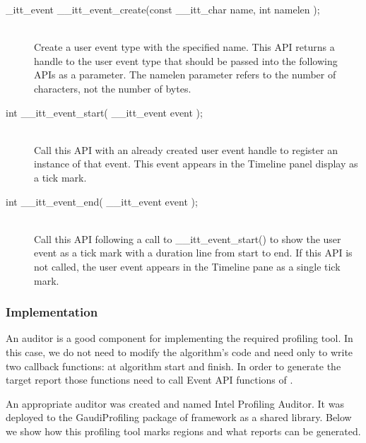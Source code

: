 \begin{description}
\item[\_itt\_event \_\_itt\_event\_create(const \_\_itt\_char \*name, int namelen );] \hfill \\
Create a user event type with the specified name. This API returns a handle to the user event type that should be 
passed into the following APIs as a parameter. The namelen parameter refers to the number of characters, 
not the number of bytes.

\item[int \_\_itt\_event\_start( \_\_itt\_event event );] \hfill \\
Call this API with an already created user event handle to register an instance of that event. This event appears 
in the Timeline panel display as a tick mark.

\item[int \_\_itt\_event\_end( \_\_itt\_event event );] \hfill \\
Call this API following a call to \_\_itt\_event\_start() to show the user event as a tick mark with a duration line 
from start to end. If this API is not called, the user event appears in the Timeline pane as a single tick mark.
\end{description}

\subsubsection{Implementation}

An auditor is a good component for implementing the required profiling tool. In
this case, we do not need to modify the algorithm’s code and need only to write
two callback functions: at algorithm start and finish. In order to generate the
target report those functions need to call Event API functions of \amp.

An appropriate auditor was created and named \gaudi Intel Profiling Auditor. It
was deployed to the GaudiProfiling package of \gaudi framework as a shared
library. Below we show how this profiling tool marks regions and what reports
can be generated.

